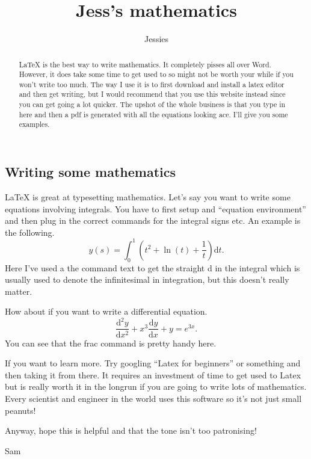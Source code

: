 \documentclass[a4paper]{article}
\title{Jess's mathematics}
\author{Jessies}
\begin{document}
\begin{preview}
\maketitle

\begin{abstract}
\LaTeX{} is the best way to write mathematics. It completely pisses all over Word. However, it does take some time to get used to so might not be worth your while if you won't write too much. The way I use it is to first download and install a latex editor and then get writing, but I would recommend that you use this website instead since you can get going a lot quicker. The upshot of the whole business is that you type in here and then a pdf is generated with all the equations looking ace. I'll give you some examples. 
\end{abstract}

\section{Writing some mathematics}

\LaTeX{} is great at typesetting mathematics. Let's say you want to write some equations involving integrals. You have to first setup and ``equation environment'' and then plug in the correct commands for the integral signs etc. An example is the following.
\begin{equation}
		y(s) = \int_0^1 \left(t^2+\ln(t)+\frac{1}{t}\right)\text{d}t.
\end{equation}
Here I've used a the command text to get the straight d in the integral which is usually used to denote the infinitesimal in integration, but this doesn't really matter. 

How about if you want to write a differential equation. 
\begin{equation}
		\frac{\text{d}^2y}{\text{d}x^2}+ x^3\frac{\text{d}y}{\text{d}x}+y = e^{3x}.
\end{equation}
You can see that the frac command is pretty handy here.

If you want to learn more. Try googling ``Latex for beginners'' or something and then taking it from there. It requires an investment of time to get used to Latex but is really worth it in the longrun if you are going to write lots of mathematics. Every scientist and engineer in the world uses this software so it's not just small peanuts!

Anyway, hope this is helpful and that the tone isn't too patronising!

Sam

\end{preview}
\end{document}
